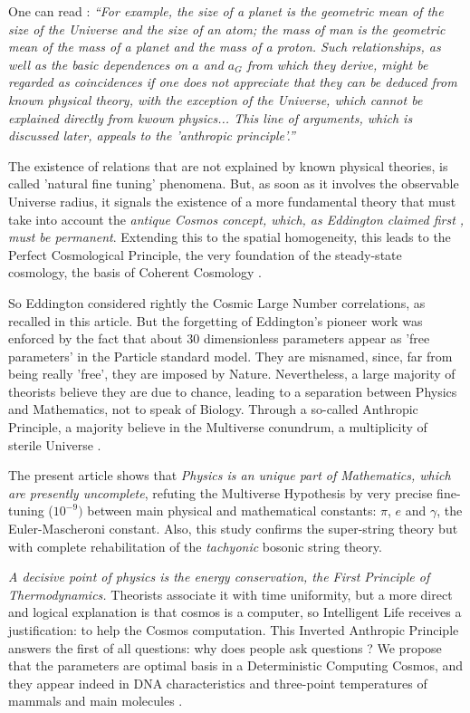 \documentclass[twoside,draft]{article}
\begin{document}
\begin{sloppypar}
One can read \cite{Carr}: \textit{“For example, the size of a planet is the geometric mean of the size of the Universe and the size of an atom; the mass of man is the geometric mean of the mass of a planet and the mass of a proton. Such relationships, as well as the basic dependences on $a$ and $a_G$ from which they derive, might be regarded as coincidences if one does not appreciate that they can be deduced from known physical theory, with the exception of the Universe, which cannot be explained directly from kwown physics... This line of arguments, which is discussed later, appeals to the 'anthropic principle'.”}

The existence of relations that are not explained by known physical theories, is called 'natural fine tuning' phenomena. But, as soon as it involves the observable Universe radius, it signals the existence of a more fundamental theory that must take into account the \textit{antique Cosmos concept, which, as Eddington claimed first \cite{Eddy}, must be permanent}. Extending this to the spatial homogeneity, this leads to the Perfect Cosmological Principle, the very foundation of the steady-state cosmology, the basis of Coherent Cosmology \cite{Sanchez1}.

So Eddington considered rightly the Cosmic Large Number correlations, as recalled in this article. But the forgetting of Eddington's pioneer work was enforced by the fact that about 30 dimensionless parameters appear as 'free parameters' in the Particle standard model. They are misnamed, since, far from being really 'free', they are imposed by Nature. Nevertheless, a large majority of theorists believe they are due to chance, leading to a separation between Physics and Mathematics, not to speak of Biology. Through a so-called Anthropic Principle, a majority believe in the Multiverse conundrum, a multiplicity of sterile Universe \cite{Carr}.

The present article shows that \textit{Physics is an unique part of Mathematics, which are presently uncomplete}, refuting the Multiverse Hypothesis by very precise fine-tuning ($10^{-9})$ between main physical and mathematical constants: $\pi$, $e$ and $\gamma$, the Euler-Mascheroni constant. Also, this study confirms the super-string theory but with complete rehabilitation of the \textit{tachyonic} bosonic string theory.

\textit{A decisive point of physics is the energy conservation, the First Principle of Thermodynamics.} Theorists associate it with time uniformity, but a more direct and logical explanation is that cosmos is a computer, so Intelligent Life receives a justification: to help the Cosmos computation. This Inverted Anthropic Principle answers the first of all questions: why does people ask questions ? We propose that the parameters are optimal basis in a Deterministic Computing Cosmos, and they appear indeed in DNA characteristics and three-point temperatures of mammals and main molecules \cite{Sanchez1}.


\end{sloppypar}
\end{document}
